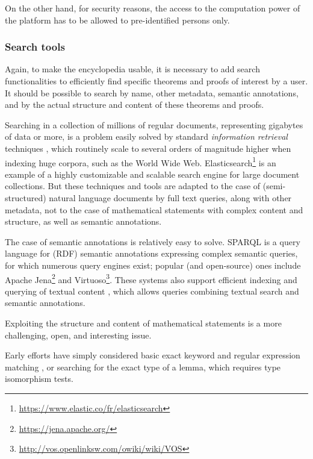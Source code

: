 On the other hand, for security reasons, the access to the computation
power of the platform has to be allowed to pre-identified persons only.

\subsubsection*{Search tools}

Again, to make the encyclopedia usable, it is necessary to add search
functionalities to efficiently find specific theorems and proofs of
interest by a user. It should be possible to search by name, other
metadata, semantic annotations, and by the actual structure and content
of these theorems and proofs.

Searching in a collection of millions of regular documents, representing
gigabytes of data or more, is a problem easily solved by standard
\emph{information retrieval} techniques \cite{DBLP:books/daglib/0021593}, 
which routinely scale to several orders of magnitude higher when indexing
huge corpora, such as the World Wide Web.
Elasticsearch\footnote{\url{https://www.elastic.co/fr/elasticsearch}} is
an example of a highly customizable and scalable search engine for large
document collections. But these techniques and tools are
adapted to the case of (semi-structured) natural language documents by
full text queries, along with other metadata, not to the case of
mathematical statements with complex content and structure, as well as
semantic annotations.

The case of semantic annotations is relatively easy to solve. SPARQL
\cite{sparql} is a
query language for (RDF) semantic annotations expressing complex semantic
queries, for which numerous
query engines exist; popular (and open-source) ones include
Apache Jena\footnote{\url{https://jena.apache.org/}} and
Virtuoso\footnote{\url{http://vos.openlinksw.com/owiki/wiki/VOS}}. These
systems also support efficient indexing and querying of textual content
\cite{DBLP:conf/esws/MinackSN09}, which allows queries combining textual
search and semantic annotations.

Exploiting the structure and content of mathematical statements is a more
challenging, open, and interesting issue.

Early efforts have simply considered
basic exact keyword and regular expression matching 
\cite{DBLP:conf/mkm/BancerekR03}, or searching for the exact type of a lemma,
which requires type isomorphism tests\cite{DBLP:conf/types/Delahaye99}.

